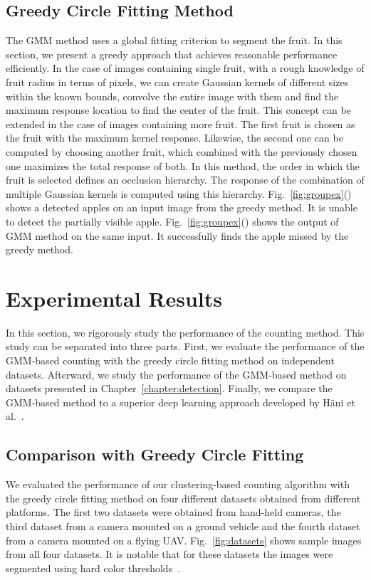 \subsection{Greedy Circle Fitting Method}\label{subsec:greedycount}
The GMM method uses a global fitting criterion to segment the fruit. In this section, we present a greedy approach that achieves reasonable performance efficiently. In the case of images containing single fruit, with a rough knowledge of fruit radius in terms of pixels, we can create Gaussian kernels of different sizes within the known bounds, convolve the entire image with them and find the maximum response location to find the center of the fruit. This concept can be extended in the case of images containing more fruit. The first fruit is chosen as the fruit with the maximum kernel response. Likewise, the second one can be computed by choosing another fruit, which combined with the previously chosen one maximizes the total response of both. In this method, the order in which the fruit is selected defines an occlusion hierarchy. The response of the combination of multiple Gaussian kernels is computed using this hierarchy. Fig.~\ref{fig:groupex}() shows a detected apples on an input image from the greedy method. It is unable to detect the partially visible apple. Fig.~\ref{fig:groupex}() shows the output of GMM method on the same input. It successfully finds the apple missed by the greedy method.


\section{Experimental Results}\label{experiments}
In this section, we rigorously study the performance of the counting method.  This study can be separated into three parts. First, we evaluate the performance of the GMM-based counting with the greedy circle fitting method on independent datasets.   Afterward, we study the performance of the GMM-based method on datasets presented in Chapter~\ref{chapter:detection}. Finally, we compare the GMM-based method to a superior deep learning approach developed by  H{\"a}ni et al.~\cite{hani_jfr_counting}. 

\subsection{Comparison with Greedy Circle Fitting}
We evaluated the performance of our clustering-based counting algorithm with the greedy circle fitting method on four different datasets obtained from different platforms. The first two datasets were obtained from hand-held cameras, the third dataset from a camera mounted on a ground vehicle and the fourth dataset from a camera mounted on a flying UAV. Fig.~\ref{fig:datasets} shows sample images from all four datasets. It is notable that for these datasets the images were segmented using hard color thresholds~\cite{techreportroy}.

